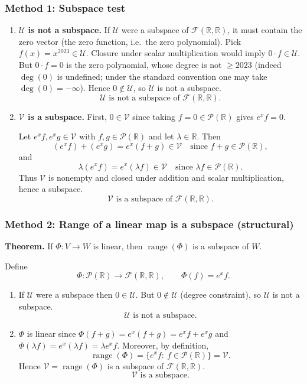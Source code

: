 \documentclass[12pt]{article}
\begin{document}
\subsubsection{Method 1: Subspace test}
\begin{enumerate}[label=(\alph*)]
\item \textbf{$\mathcal{U}$ is not a subspace.}
If $\mathcal{U}$ were a subspace of $\mathcal{F}(\mathbb{R},\mathbb{R})$, it must contain the zero vector (the zero function, i.e.\ the zero polynomial).
Pick $f(x)=x^{2023}\in\mathcal{U}$. Closure under scalar multiplication would imply $0\cdot f\in\mathcal{U}$.
But $0\cdot f=0$ is the zero polynomial, whose degree is not $\ge 2023$ (indeed $\deg(0)$ is undefined; under the standard convention one may take $\deg(0)=-\infty$). Hence $0\notin\mathcal{U}$, so $\mathcal{U}$ is not a subspace.
\[
\boxed{\,\mathcal{U}\text{ is not a subspace of }\mathcal{F}(\mathbb{R},\mathbb{R}).\,}
\]

\item \textbf{$\mathcal{V}$ is a subspace.}
First, $0\in\mathcal{V}$ since taking $f=0\in\mathcal{P}(\mathbb{R})$ gives $e^x f=0$.

Let $e^x f, e^x g\in\mathcal{V}$ with $f,g\in\mathcal{P}(\mathbb{R})$ and let $\lambda\in\mathbb{R}$. Then
\[
(e^x f)+(e^x g)=e^x(f+g)\in\mathcal{V}\quad \text{since }f+g\in\mathcal{P}(\mathbb{R}),
\]
and
\[
\lambda(e^x f)=e^x(\lambda f)\in\mathcal{V}\quad \text{since }\lambda f\in\mathcal{P}(\mathbb{R}).
\]
Thus $\mathcal{V}$ is nonempty and closed under addition and scalar multiplication, hence a subspace.
\[
\boxed{\,\mathcal{V}\text{ is a subspace of }\mathcal{F}(\mathbb{R},\mathbb{R}).\,}
\]
\end{enumerate}

\subsubsection{Method 2: Range of a linear map is a subspace (structural)}
\textbf{Theorem.} If $\Phi:V\to W$ is linear, then $\operatorname{range}(\Phi)$ is a subspace of $W$.

Define
\[
\Phi:\mathcal{P}(\mathbb{R})\to \mathcal{F}(\mathbb{R},\mathbb{R}),\qquad \Phi(f)=e^x f.
\]

\begin{enumerate}[label=(\alph*)]
\item If $\mathcal{U}$ were a subspace then $0\in\mathcal{U}$. But $0\notin\mathcal{U}$ (degree constraint), so $\mathcal{U}$ is not a subspace.
\[
\boxed{\,\mathcal{U}\text{ is not a subspace.}\,}
\]

\item $\Phi$ is linear since $\Phi(f+g)=e^x(f+g)=e^x f+e^x g$ and $\Phi(\lambda f)=e^x(\lambda f)=\lambda e^x f$.
Moreover, by definition,
\[
\operatorname{range}(\Phi)=\{e^x f:\ f\in\mathcal{P}(\mathbb{R})\}=\mathcal{V}.
\]
Hence $\mathcal{V}=\operatorname{range}(\Phi)$ is a subspace of $\mathcal{F}(\mathbb{R},\mathbb{R})$.
\[
\boxed{\,\mathcal{V}\text{ is a subspace.}\,}
\]
\end{enumerate}
\end{document}
